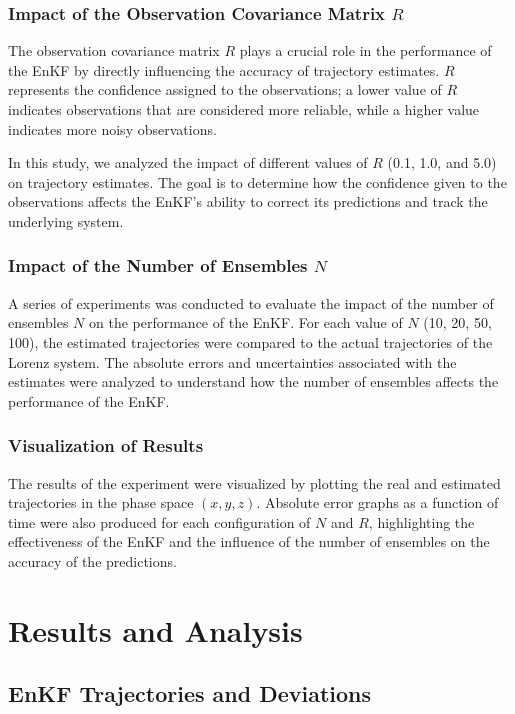 \documentclass[a4paper,12pt,french]{article}
\begin{document}
\subsubsection{Impact of the Observation Covariance Matrix $R$}
The observation covariance matrix $R$ plays a crucial role in the performance 
of the EnKF by directly influencing the accuracy of trajectory estimates. 
$R$ represents the confidence assigned to the observations; a lower value 
of $R$ indicates observations that are considered more reliable, 
while a higher value indicates more noisy observations.

In this study, we analyzed the impact of different values of $R$ (0.1, 1.0, and 5.0) 
on trajectory estimates. The goal is to determine how the confidence given 
to the observations affects the EnKF's ability to correct its predictions 
and track the underlying system.

\subsubsection{Impact of the Number of Ensembles $N$}

A series of experiments was conducted to evaluate the 
impact of the number of ensembles $N$ on the performance 
of the EnKF. For each value of $N$ (10, 20, 50, 100), 
the estimated trajectories were compared to the actual 
trajectories of the Lorenz system. The absolute errors 
and uncertainties associated with the estimates were 
analyzed to understand how the number of ensembles affects 
the performance of the EnKF.

\subsubsection{Visualization of Results}
The results of the experiment were visualized by plotting 
the real and estimated trajectories in the phase space 
$(x, y, z)$. Absolute error graphs as a function of time 
were also produced for each configuration of $N$ and $R$, 
highlighting the effectiveness of the EnKF and the influence 
of the number of ensembles on the accuracy of the predictions.

\section{Results and Analysis}
\subsection{EnKF Trajectories and Deviations}
\end{document}
